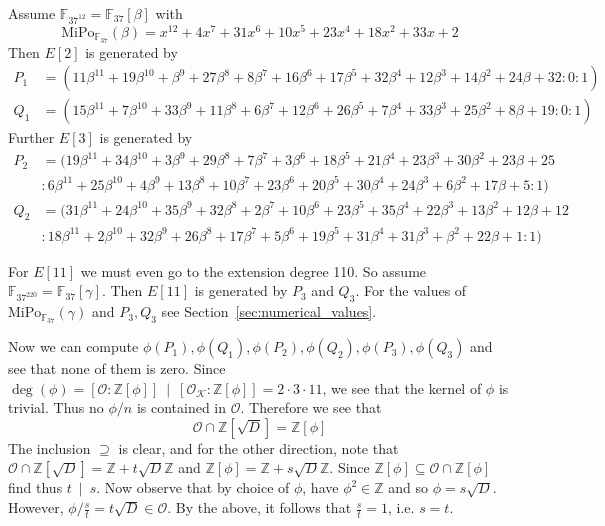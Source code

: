 \documentclass{scrartcl}
\newcommand{\Z}{\mathbb{Z}}
\newcommand{\F}{\mathbb{F}}
\newcommand{\divides}{\ \mid \ }
\newcommand{\K}{\mathcal{K}}
\renewcommand{\O}{\mathcal{O}}
\theoremstyle{definition}
\begin{document}
Assume $\F_{37^{12}} = \F_{37}[\beta]$ with
\begin{equation*}
    \mathrm{MiPo}_{\F_{37}}(\beta) = x^{12} + 4x^7 + 31x^6 + 10x^5 + 23x^4 + 18x^2 + 33x + 2
\end{equation*}
Then $E[2]$ is generated by
\begin{align*}
    P_1 &= (11\beta^{11} + 19\beta^{10} + \beta^9 + 27\beta^8 + 8\beta^7 + 16\beta^6 + 17\beta^5 + 32\beta^4 + 12\beta^3 + 14\beta^2 + 24\beta + 32 : 0 : 1) \\
    Q_1 &= (15\beta^{11} + 7\beta^{10} + 33\beta^9 + 11\beta^8 + 6\beta^7 + 12\beta^6 + 26\beta^5 + 7\beta^4 + 33\beta^3 + 25\beta^2 + 8\beta + 19 : 0 : 1)
\end{align*}
Further $E[3]$ is generated by
\begin{align*}
    P_2 &= (19\beta^{11} + 34\beta^{10} + 3\beta^9 + 29\beta^8 + 7\beta^7 + 3\beta^6 + 18\beta^5 + 21\beta^4 + 23\beta^3 + 30\beta^2 + 23\beta + 25 \\
    &: 6\beta^{11} + 25\beta^{10} + 4\beta^9 + 13\beta^8 + 10\beta^7 + 23\beta^6 + 20\beta^5 + 30\beta^4 + 24\beta^3 + 6\beta^2 + 17\beta + 5 : 1) \\
    Q_2 &= (31\beta^{11} + 24\beta^{10} + 35\beta^9 + 32\beta^8 + 2\beta^7 + 10\beta^6 + 23\beta^5 + 35\beta^4 + 22\beta^3 + 13\beta^2 + 12\beta + 12 \\
    &: 18\beta^{11} + 2\beta^{10} + 32\beta^9 + 26\beta^8 + 17\beta^7 + 5\beta^6 + 19\beta^5 + 31\beta^4 + 31\beta^3 + \beta^2 + 22\beta + 1 : 1)
\end{align*}

For $E[11]$ we must even go to the extension degree 110.
So assume $\F_{37^{220}} = \F_{37}[\gamma]$.
Then $E[11]$ is generated by $P_3$ and $Q_3$.
For the values of $\mathrm{MiPo}_{\F_{37}}(\gamma)$ and $P_3, Q_3$ see Section~\ref{sec:numerical_values}.

Now we can compute $\phi(P_1), \phi(Q_1), \phi(P_2), \phi(Q_2), \phi(P_3), \phi(Q_3)$ and see that none of them is zero.
Since $\deg(\phi) = [\O : \Z[\phi]] \divides [\O_\K : \Z[\phi]] = 2 \cdot 3 \cdot 11$, we see that the kernel of $\phi$ is trivial.
Thus no $\phi/n$ is contained in $\O$.
Therefore we see that
\begin{equation*}
    \O \cap \Z[\sqrt{D}] = \Z[\phi]
\end{equation*}
The inclusion $\supseteq$ is clear, and for the other direction, note that $\O \cap \Z[\sqrt{D}] = \Z + t\sqrt{D}\Z$ and $\Z[\phi] = \Z + s\sqrt{D}\Z$.
Since $\Z[\phi] \subseteq \O \cap \Z[\phi]$ find thus $t \divides s$.
Now observe that by choice of $\phi$, have $\phi^2 \in \Z$ and so $\phi = s\sqrt{D}$.
However, $\phi/\frac s t = t \sqrt{D} \in \O$.
By the above, it follows that $\frac s t = 1$, i.e. $s = t$.
\end{document}
